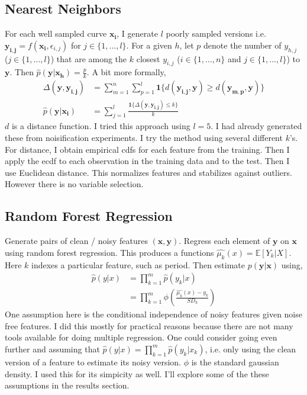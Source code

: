 \documentclass[10pt]{article}
\begin{document}
\subsection{Nearest Neighbors}
For each well sampled curve $\mathbf{x_i}$, I generate $l$ poorly sampled versions i.e. $\mathbf{y_{i,j}} = f(\mathbf{x_i},\epsilon_{i,j})$ for $j \in \{1, \ldots, l\}$. For a given $h$, let $p$ denote the number of $y_{h,j}$ ($j \in \{1, \ldots ,l\}$) that are among the $k$ closest $y_{i,j}$ ($i \in \{1, \ldots ,n\}$ and $j \in \{1, \ldots ,l\}$) to $\mathbf{y}$. Then $\hat{p}(\mathbf{y}|\mathbf{x_h}) = \frac{p}{k}$. A bit more formally,
\begin{align*}
\Delta(\mathbf{y},\mathbf{y_{i,j}}) &= \sum_{m=1}^n \sum_{p=1}^{l} \mathbf{1}\{d(\mathbf{y_{i,j}},\mathbf{y}) \geq d(\mathbf{y_{m,p}},\mathbf{y})\}\\
\hat{p}(\mathbf{y}|\mathbf{x_i}) &= \sum_{j=1}^l \frac{\mathbf{1}\{\Delta(\mathbf{y},\mathbf{y_{i,j}}) \leq k\}}{k}
\end{align*}
$d$ is a distance function. I tried this approach using $l=5$. I had already generated these from noisification experiments. I try the method using several different $k$'s. For distance, I obtain empirical cdfs for each feature from the training. Then I apply the ecdf to each observation in the training data and to the test. Then I use Euclidean distance. This normalizes features and stabilizes against outliers. However there is no variable selection.


\subsection{Random Forest Regression}
Generate pairs of clean / noisy features $(\mathbf{x},\mathbf{y})$. Regress each element of $\mathbf{y}$ on $\mathbf{x}$ using random forest regression. This produces a functions $\hat{\mu_k}(x) = \mathbb{E}[Y_k|X]$. Here $k$ indexes a particular feature, such as period. Then estimate $p(\mathbf{y}|\mathbf{x})$ using,
\begin{align*}
\hat{p}(y | x) &= \prod_{k=1}^m \hat{p}(y_k|x)\\
&=\prod_{k=1}^m \phi \left( \frac{\hat{\mu_k}(x) - y_k} {SD_k}\right)
\end{align*}
One assumption here is the conditional independence of noisy features given noise free features. I did this mostly for practical reasons because there are not many tools available for doing multiple regression. One could consider going even further and assuming that $\hat{p}(y | x) = \prod_{k=1}^m \hat{p}(y_k|x_k)$, i.e. only using the clean version of a feature to estimate its noisy version. $\phi$ is the standard gaussian density. I used this for its simpicity as well. I'll explore some of the these assumptions in the results section.
\end{document}
